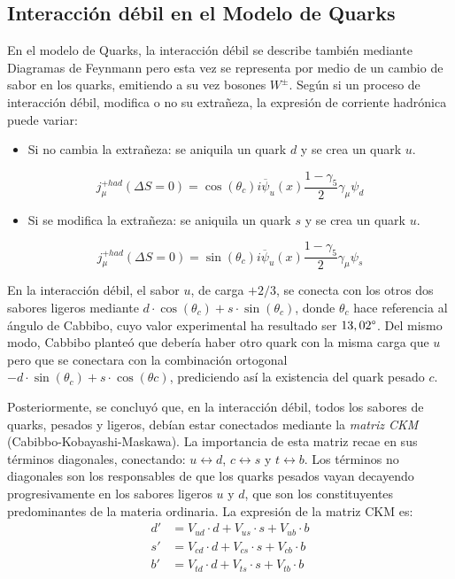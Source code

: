 \subsection{Interacción débil en el Modelo de Quarks}\label{sec:weak_int_quarks}
En el modelo de Quarks, la interacción débil se describe también mediante Diagramas de Feynmann pero esta vez se representa por medio de un cambio de sabor en los quarks, emitiendo a su vez bosones $W^{\pm}$. Según si un proceso de interacción débil, modifica o no su extrañeza, la expresión de corriente hadrónica puede variar:
\begin{itemize}
\item Si no cambia la extrañeza: se aniquila un quark $d$ y se crea un quark $u$.
\end{itemize}
\begin{equation}
j_{\mu}^{+had}(\Delta S= 0)=\cos \left( \theta _{c}\right) i\overline{\psi }_{u}\left( x\right) \dfrac{1-\gamma _{5}}{2}\gamma _{\mu }\psi _{d}
\end{equation}
\begin{itemize}
\item Si se modifica la extrañeza: se aniquila un quark $s$ y se crea un quark $u$.
\end{itemize}
\begin{equation}
j_{\mu}^{+had}(\Delta S= 0)=\sin \left( \theta _{c}\right) i\overline{\psi }_{u}\left( x\right) \dfrac{1-\gamma _{5}}{2}\gamma _{\mu }\psi _{s}
\end{equation}

En la interacción débil, el sabor $u$, de carga $+2/3$, se conecta con los otros dos sabores ligeros mediante $d\cdot \cos \left( \theta _{c}\right) +s\cdot \sin \left( \theta _{c}\right)$, donde $\theta _{c}$ hace referencia al ángulo de Cabbibo, cuyo valor experimental ha resultado ser $13,02\degree$. Del mismo modo, Cabbibo planteó que debería haber otro quark con la misma carga que $u$ pero que se conectara con la combinación ortogonal $-d\cdot \sin \left( \theta _{c}\right) +s\cdot \cos \left( \theta c\right)$, prediciendo así la existencia del quark pesado $c$.

Posteriormente, se concluyó que, en la interacción débil, todos los sabores de quarks, pesados y ligeros, debían estar conectados mediante la \textit{matriz CKM} (Cabibbo-Kobayashi-Maskawa). La importancia de esta matriz recae en sus términos diagonales, conectando: $u\leftrightarrow d$, $c\leftrightarrow s$ y $t\leftrightarrow b$. Los términos no diagonales son los responsables de que los quarks pesados vayan decayendo progresivamente en los sabores ligeros $u$ y $d$, que son los constituyentes predominantes de la materia ordinaria. La expresión de la matriz CKM es:
\begin{align}
d' &= V_{ud}\cdot d+V_{us}\cdot s + V_{ub}\cdot b \nonumber \\
s' &= V_{cd}\cdot d+V_{cs}\cdot s + V_{cb}\cdot b \label{eq:CKM}\\
b' &= V_{td}\cdot d+V_{ts}\cdot s + V_{tb}\cdot b \nonumber
\end{align}

